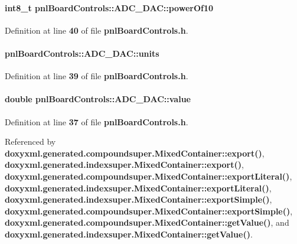 \paragraph[{power\+Of10}]{\setlength{\rightskip}{0pt plus 5cm}int8\+\_\+t pnl\+Board\+Controls\+::\+A\+D\+C\+\_\+\+D\+A\+C\+::power\+Of10}\label{structpnlBoardControls_1_1ADC__DAC_a78e40fe158267136e45aed8638823d9c}


Definition at line {\bf 40} of file {\bf pnl\+Board\+Controls.\+h}.

\paragraph[{units}]{ pnl\+Board\+Controls\+::\+A\+D\+C\+\_\+\+D\+A\+C\+::units}\label{structpnlBoardControls_1_1ADC__DAC_ac281d3e8966bf2b3bd408a31b9cc1317}


Definition at line {\bf 39} of file {\bf pnl\+Board\+Controls.\+h}.

\paragraph[{value}]{\setlength{\rightskip}{0pt plus 5cm}double pnl\+Board\+Controls\+::\+A\+D\+C\+\_\+\+D\+A\+C\+::value}\label{structpnlBoardControls_1_1ADC__DAC_a2017fddf0bd30cf50de24409aaedaf52}


Definition at line {\bf 37} of file {\bf pnl\+Board\+Controls.\+h}.



Referenced by {\bf doxyxml.\+generated.\+compoundsuper.\+Mixed\+Container\+::export()}, {\bf doxyxml.\+generated.\+indexsuper.\+Mixed\+Container\+::export()}, {\bf doxyxml.\+generated.\+compoundsuper.\+Mixed\+Container\+::export\+Literal()}, {\bf doxyxml.\+generated.\+indexsuper.\+Mixed\+Container\+::export\+Literal()}, {\bf doxyxml.\+generated.\+indexsuper.\+Mixed\+Container\+::export\+Simple()}, {\bf doxyxml.\+generated.\+compoundsuper.\+Mixed\+Container\+::export\+Simple()}, {\bf doxyxml.\+generated.\+compoundsuper.\+Mixed\+Container\+::get\+Value()}, and {\bf doxyxml.\+generated.\+indexsuper.\+Mixed\+Container\+::get\+Value()}.

